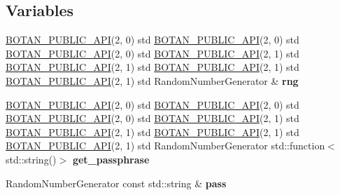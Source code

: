\subsection*{Variables}
\begin{DoxyCompactItemize}
\item 
\mbox{\label{namespace_botan_1_1_p_k_c_s8_ab5d2d5b166cd076d2dbd598c30943702}} 
\mbox{\hyperlink{namespace_botan_1_1_p_k_c_s8_a1a8abd3b8ed274b93110ebebefcb0eb6}{B\+O\+T\+A\+N\+\_\+\+P\+U\+B\+L\+I\+C\+\_\+\+A\+PI}}(2, 0) std \mbox{\hyperlink{namespace_botan_1_1_p_k_c_s8_a1a8abd3b8ed274b93110ebebefcb0eb6}{B\+O\+T\+A\+N\+\_\+\+P\+U\+B\+L\+I\+C\+\_\+\+A\+PI}}(2, 0) std \mbox{\hyperlink{namespace_botan_1_1_p_k_c_s8_a1a8abd3b8ed274b93110ebebefcb0eb6}{B\+O\+T\+A\+N\+\_\+\+P\+U\+B\+L\+I\+C\+\_\+\+A\+PI}}(2, 0) std \mbox{\hyperlink{namespace_botan_1_1_p_k_c_s8_a1a8abd3b8ed274b93110ebebefcb0eb6}{B\+O\+T\+A\+N\+\_\+\+P\+U\+B\+L\+I\+C\+\_\+\+A\+PI}}(2, 1) std \mbox{\hyperlink{namespace_botan_1_1_p_k_c_s8_a1a8abd3b8ed274b93110ebebefcb0eb6}{B\+O\+T\+A\+N\+\_\+\+P\+U\+B\+L\+I\+C\+\_\+\+A\+PI}}(2, 1) std \mbox{\hyperlink{namespace_botan_1_1_p_k_c_s8_a1a8abd3b8ed274b93110ebebefcb0eb6}{B\+O\+T\+A\+N\+\_\+\+P\+U\+B\+L\+I\+C\+\_\+\+A\+PI}}(2, 1) std \mbox{\hyperlink{namespace_botan_1_1_p_k_c_s8_a1a8abd3b8ed274b93110ebebefcb0eb6}{B\+O\+T\+A\+N\+\_\+\+P\+U\+B\+L\+I\+C\+\_\+\+A\+PI}}(2, 1) std Random\+Number\+Generator \& {\bfseries rng}
\item 
\mbox{\label{namespace_botan_1_1_p_k_c_s8_a8f34bd15202e08b3f0f4536a9b66c592}} 
\mbox{\hyperlink{namespace_botan_1_1_p_k_c_s8_a1a8abd3b8ed274b93110ebebefcb0eb6}{B\+O\+T\+A\+N\+\_\+\+P\+U\+B\+L\+I\+C\+\_\+\+A\+PI}}(2, 0) std \mbox{\hyperlink{namespace_botan_1_1_p_k_c_s8_a1a8abd3b8ed274b93110ebebefcb0eb6}{B\+O\+T\+A\+N\+\_\+\+P\+U\+B\+L\+I\+C\+\_\+\+A\+PI}}(2, 0) std \mbox{\hyperlink{namespace_botan_1_1_p_k_c_s8_a1a8abd3b8ed274b93110ebebefcb0eb6}{B\+O\+T\+A\+N\+\_\+\+P\+U\+B\+L\+I\+C\+\_\+\+A\+PI}}(2, 0) std \mbox{\hyperlink{namespace_botan_1_1_p_k_c_s8_a1a8abd3b8ed274b93110ebebefcb0eb6}{B\+O\+T\+A\+N\+\_\+\+P\+U\+B\+L\+I\+C\+\_\+\+A\+PI}}(2, 1) std \mbox{\hyperlink{namespace_botan_1_1_p_k_c_s8_a1a8abd3b8ed274b93110ebebefcb0eb6}{B\+O\+T\+A\+N\+\_\+\+P\+U\+B\+L\+I\+C\+\_\+\+A\+PI}}(2, 1) std \mbox{\hyperlink{namespace_botan_1_1_p_k_c_s8_a1a8abd3b8ed274b93110ebebefcb0eb6}{B\+O\+T\+A\+N\+\_\+\+P\+U\+B\+L\+I\+C\+\_\+\+A\+PI}}(2, 1) std \mbox{\hyperlink{namespace_botan_1_1_p_k_c_s8_a1a8abd3b8ed274b93110ebebefcb0eb6}{B\+O\+T\+A\+N\+\_\+\+P\+U\+B\+L\+I\+C\+\_\+\+A\+PI}}(2, 1) std Random\+Number\+Generator std\+::function$<$ std\+::string()$>$ {\bfseries get\+\_\+passphrase}
\item 
\mbox{\label{namespace_botan_1_1_p_k_c_s8_a09579aec1504665fce7ad86098758f72}} 
Random\+Number\+Generator const std\+::string \& {\bfseries pass}
\end{DoxyCompactItemize}



